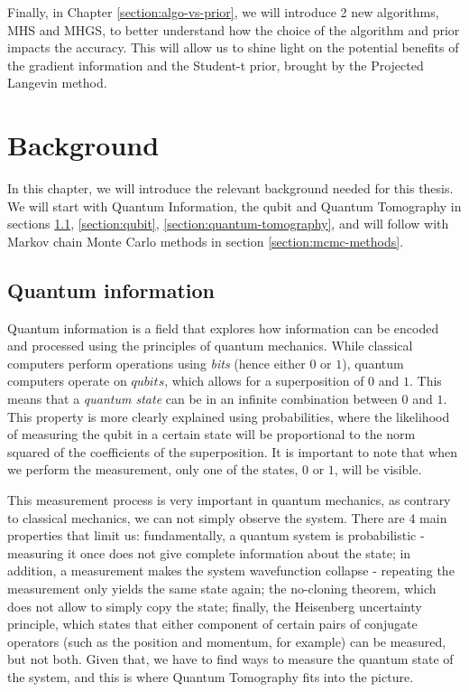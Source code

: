 \documentclass[12pt]{memoir}
\begin{document}
Finally, in Chapter \ref{section:algo-vs-prior}, we will introduce 2 new algorithms, MHS and MHGS, to better understand how the choice of the algorithm and prior impacts the accuracy. This will allow us to shine light on the potential benefits of the gradient information and the Student-t prior, brought by the Projected Langevin method.



\chapter{Background}\label{section:background}


In this chapter, we will introduce the relevant background needed for this thesis. We will start with Quantum Information, the qubit and Quantum Tomography in sections \ref{section:quantum-information}, \ref{section:qubit}, \ref{section:quantum-tomography}, and will follow with Markov chain Monte Carlo methods in section \ref{section:mcmc-methods}.


\section{Quantum information}\label{section:quantum-information}


Quantum information is a field that explores how information can be encoded and processed using the principles of quantum mechanics. While classical computers perform operations using \textit{bits} (hence either $0$ or $1$), quantum computers operate on $qubits$, which allows for a superposition of $0$ and $1$. This means that a \textit{quantum state} can be in an infinite combination between $0$ and $1$. This property is more clearly explained using probabilities, where the likelihood of measuring the qubit in a certain state will be proportional to the norm squared of the coefficients of the superposition. It is important to note that when we perform the measurement, only one of the states, $0$ or $1$, will be visible.\medbreak


This measurement process is very important in quantum mechanics, as contrary to classical mechanics, we can not simply observe the system. There are 4 main properties that limit us: fundamentally, a quantum system is probabilistic - measuring it once does not give complete information about the state; in addition, a measurement makes the system wavefunction collapse - repeating the measurement only yields the same state again; the no-cloning theorem, which does not allow to simply copy the state; finally, the Heisenberg uncertainty principle, which states that either component of certain pairs of conjugate operators (such as the position and momentum, for example) can be measured, but not both. Given that, we have to find ways to measure the quantum state of the system, and this is where Quantum Tomography fits into the picture.
\end{document}
